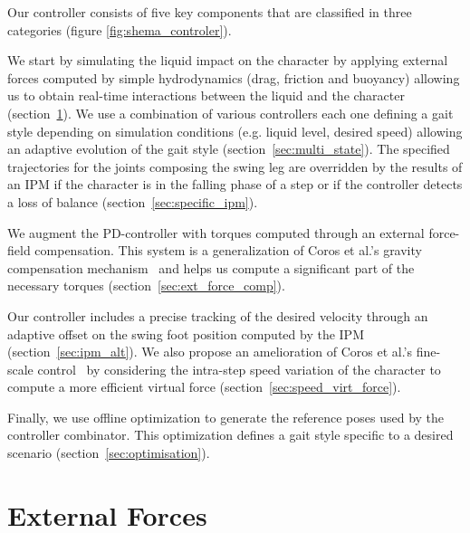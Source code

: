 \documentclass[conference]{acmsiggraph}
\begin{document}
Our controller consists of five key components that are classified in three categories (figure \ref{fig:shema_controler}).

We start by simulating the liquid impact on the character by applying external forces computed by simple hydrodynamics (drag, friction and buoyancy) allowing us to obtain real-time interactions between the liquid and the character (section~\ref{sec:ext_forces}).
We use a combination of various controllers each one defining a gait style depending on simulation conditions (e.g. liquid level, desired speed) allowing an adaptive evolution of the gait style (section~\ref{sec:multi_state}). The specified trajectories for the joints composing the swing leg are overridden by the results of an IPM if the character is in the falling phase of a step or if the controller detects a loss of balance (section~\ref{sec:specific_ipm}).

We augment the PD-controller with torques computed through an external force-field compensation. This system is a generalization of Coros et al.'s gravity compensation mechanism~\cite{coros2010generalized} and helps us compute a significant part of the necessary torques (section~\ref{sec:ext_force_comp}).

Our controller includes a precise tracking of the desired velocity through an adaptive offset on the swing foot position computed by the IPM (section~\ref{sec:ipm_alt}). We also propose an amelioration of Coros et al.'s fine-scale control~\cite{coros2010generalized} by considering the intra-step speed variation of the character to compute a more efficient virtual force (section~\ref{sec:speed_virt_force}).

Finally, we use offline optimization to generate the reference poses used by the controller combinator. This optimization defines a gait style specific to a desired scenario (section~\ref{sec:optimisation}).

\section{External Forces}
\label{sec:ext_forces}
\end{document}

